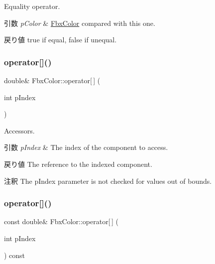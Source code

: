 Equality operator. 
\begin{DoxyParams}{引数}
{\em p\+Color} & \hyperlink{class_fbx_color}{Fbx\+Color} compared with this one. \\
\hline
\end{DoxyParams}
\begin{DoxyReturn}{戻り値}
{\ttfamily true} if equal, {\ttfamily false} if unequal. 
\end{DoxyReturn}
\mbox{\label{class_fbx_color_ac396e40fa972caa64f29e94605660324}} 
\subsubsection{\texorpdfstring{operator[]()}{operator[]()}\hspace{0.1cm}{\footnotesize\ttfamily [1/2]}}
{\footnotesize\ttfamily double\& Fbx\+Color\+::operator\mbox{[}$\,$\mbox{]} (\begin{DoxyParamCaption}\item[{int}]{p\+Index }\end{DoxyParamCaption})}

Accessors. 
\begin{DoxyParams}{引数}
{\em p\+Index} & The index of the component to access. \\
\hline
\end{DoxyParams}
\begin{DoxyReturn}{戻り値}
The reference to the indexed component. 
\end{DoxyReturn}
\begin{DoxyRemark}{注釈}
The p\+Index parameter is not checked for values out of bounds. 
\end{DoxyRemark}
\mbox{\label{class_fbx_color_a578f043b19c6303d74c19d41daf2a254}} 
\subsubsection{\texorpdfstring{operator[]()}{operator[]()}\hspace{0.1cm}{\footnotesize\ttfamily [2/2]}}
{\footnotesize\ttfamily const double\& Fbx\+Color\+::operator\mbox{[}$\,$\mbox{]} (\begin{DoxyParamCaption}\item[{int}]{p\+Index }\end{DoxyParamCaption}) const}

